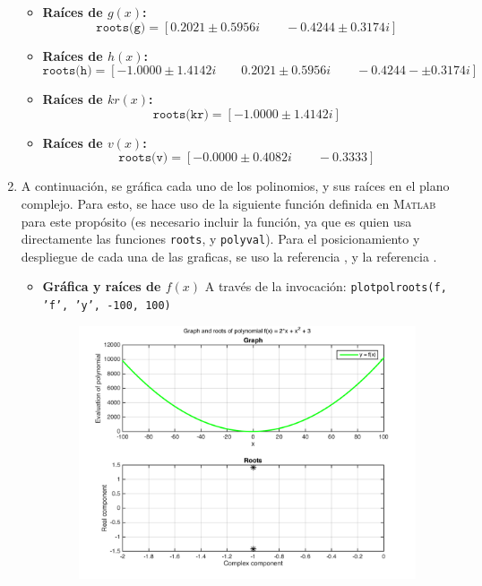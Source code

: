 \documentclass[11pt, spanish]{article}
\begin{document}
\begin{enumerate}
\begin{itemize}
\item \textbf{Raíces de $g(x)$:} $$\texttt{roots(g)} = [0.2021 \pm 0.5956i   \qquad -0.4244 \pm 0.3174i]$$

\item \textbf{Raíces de $h(x)$:} $$\texttt{roots(h)} = [-1.0000 \pm 1.4142i    \qquad 0.2021 \pm 0.5956i   \qquad -0.4244 -\pm 0.3174i]$$

\item \textbf{Raíces de $kr(x)$:} $$\texttt{roots(kr)} = [-1.0000 \pm 1.4142i]$$

\item \textbf{Raíces de $v(x)$:} $$\texttt{roots(v)} = [-0.0000 \pm 0.4082i  \qquad -0.3333]$$

\end{itemize}

\newpage

\item A continuación, se gráfica cada uno de los polinomios, y sus raíces en el plano complejo. Para esto, se hace uso de la siguiente función definida en \textsc{Matlab} para este propósito (es necesario incluir la función, ya que es quien usa directamente las funciones \texttt{roots}, y \texttt{polyval}). Para el posicionamiento y despliegue de cada una de las graficas, se uso la referencia \cite{jaluria2011computer}, y la referencia \cite{siauw2014introduction}.\\



\newpage

\begin{itemize}
\item \textbf{Gráfica y raíces de $f(x)$} A través de la invocación: \texttt{plotpolroots(f, 'f', 'y', -100, 100)}

\begin{figure}[H]
\centering
	\includegraphics[scale=0.6]{data/img/fplot}
	\caption{}
\end{figure}


\end{itemize}
\end{enumerate}
\end{document}
